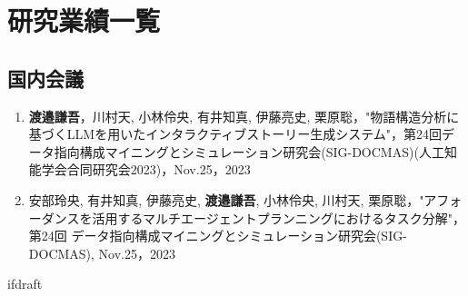 \documentclass[a4paper,12pt]{jreport}
\begin{document}
\fi

\chapter*{研究業績一覧} \label{performance}

\section*{国内会議}

\begin{enumerate}[label=(\roman*)]
\item \textbf{渡邉謙吾}，川村天, 小林伶央, 有井知真, 伊藤亮史, 栗原聡，"物語構造分析に基づくLLMを用いたインタラクティブストーリー生成システム"，第24回データ指向構成マイニングとシミュレーション研究会(SIG-DOCMAS)(人工知能学会合同研究会2023)，Nov.25，2023
\item 安部玲央, 有井知真, 伊藤亮史, \textbf{渡邉謙吾}, 小林伶央, 川村天, 栗原聡，"アフォーダンスを活用するマルチエージェントプランニングにおけるタスク分解"，第24回 データ指向構成マイニングとシミュレーション研究会(SIG-DOCMAS), Nov.25，2023
\end{enumerate}

\expandafter\ifx\csname ifdraft\endcsname\relax
   
\end{document}

